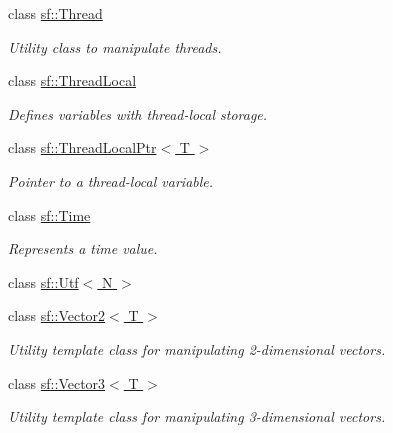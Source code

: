 \begin{DoxyCompactItemize}
class \hyperlink{classsf_1_1Thread}{sf\+::\+Thread}
\begin{DoxyCompactList}\small\item\em Utility class to manipulate threads. \end{DoxyCompactList}\item 
class \hyperlink{classsf_1_1ThreadLocal}{sf\+::\+Thread\+Local}
\begin{DoxyCompactList}\small\item\em Defines variables with thread-\/local storage. \end{DoxyCompactList}\item 
class \hyperlink{classsf_1_1ThreadLocalPtr}{sf\+::\+Thread\+Local\+Ptr$<$ T $>$}
\begin{DoxyCompactList}\small\item\em Pointer to a thread-\/local variable. \end{DoxyCompactList}\item 
class \hyperlink{classsf_1_1Time}{sf\+::\+Time}
\begin{DoxyCompactList}\small\item\em Represents a time value. \end{DoxyCompactList}\item 
class \hyperlink{classsf_1_1Utf}{sf\+::\+Utf$<$ N $>$}
\item 
class \hyperlink{classsf_1_1Vector2}{sf\+::\+Vector2$<$ T $>$}
\begin{DoxyCompactList}\small\item\em Utility template class for manipulating 2-\/dimensional vectors. \end{DoxyCompactList}\item 
class \hyperlink{classsf_1_1Vector3}{sf\+::\+Vector3$<$ T $>$}
\begin{DoxyCompactList}\small\item\em Utility template class for manipulating 3-\/dimensional vectors. \end{DoxyCompactList}\end{DoxyCompactItemize}
